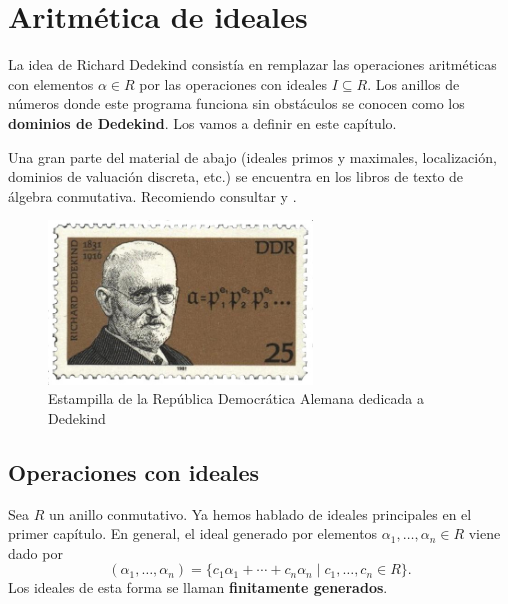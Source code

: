 \chapter{Aritmética de ideales}

La idea de Richard Dedekind consistía en remplazar las operaciones aritméticas
con elementos $\alpha \in R$ por las operaciones con ideales $I\subseteq R$.
Los anillos de números donde este programa funciona sin obstáculos se conocen
como los \textbf{dominios de Dedekind}. Los vamos a definir en este capítulo.

Una gran parte del material de abajo (ideales primos y maximales, localización,
dominios de valuación discreta, etc.) se encuentra en los libros de texto de
álgebra conmutativa. Recomiendo consultar \cite{Atiyah-Macdonald} y
\cite{Reid-UCA}.

\begin{figure}
  \begin{center}
    \includegraphics[width=7cm]{pic/Dedekind_stamp.jpg}
  \end{center}

  \caption{Estampilla de la República Democrática Alemana dedicada a Dedekind}
\end{figure}

\section{Operaciones con ideales}


Sea $R$ un anillo conmutativo. Ya hemos hablado de ideales principales en
el primer capítulo. En general, el ideal generado por elementos
$\alpha_1,\ldots,\alpha_n \in R$ viene dado por
\[ (\alpha_1,\ldots,\alpha_n) =
   \{ c_1 \alpha_1 + \cdots + c_n \alpha_n \mid c_1,\ldots,c_n \in R \}. \]
Los ideales de esta forma se llaman \textbf{finitamente generados}.

